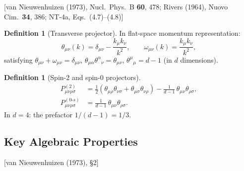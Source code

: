 \documentclass[11pt,a4paper]{article}
\theoremstyle{plain}
\theoremstyle{definition}
\newtheorem{definition}[theorem]{Definition}
\theoremstyle{remark}
\newcommand{\fromlit}[1]{\textcolor{sctblue}{\textsf{[#1]}}}
\begin{document}
\fromlit{van Nieuwenhuizen (1973), Nucl.\ Phys.\ B \textbf{60}, 478;
Rivers (1964), Nuovo Cim.\ \textbf{34}, 386;
NT-4a, Eqs.~(4.7)--(4.8)}

\begin{definition}[Transverse projector]\label{def:theta}
In flat-space momentum representation:
\begin{equation}\label{eq:theta}
  \theta_{\mu\nu}(k) = \delta_{\mu\nu} - \frac{k_\mu k_\nu}{k^2},
  \qquad
  \omega_{\mu\nu}(k) = \frac{k_\mu k_\nu}{k^2},
\end{equation}
satisfying $\theta_{\mu\nu} + \omega_{\mu\nu} = \delta_{\mu\nu}$,
$\theta_{\mu\alpha}\theta^{\alpha}{}_\nu = \theta_{\mu\nu}$,
$\theta^\mu{}_\mu = d - 1$ (in $d$ dimensions).
\end{definition}

\begin{definition}[Spin-2 and spin-0 projectors]\label{def:BR}
\begin{align}
  P^{(2)}_{\mu\nu\rho\sigma}
  &= \frac{1}{2}(\theta_{\mu\rho}\theta_{\nu\sigma}
  + \theta_{\mu\sigma}\theta_{\nu\rho})
  - \frac{1}{d-1}\,\theta_{\mu\nu}\theta_{\rho\sigma},
  \label{eq:P2}\\
  P^{(0\text{-}s)}_{\mu\nu\rho\sigma}
  &= \frac{1}{d-1}\,\theta_{\mu\nu}\theta_{\rho\sigma}.
  \label{eq:P0s}
\end{align}
In $d = 4$: the prefactor $1/(d-1) = 1/3$.
\end{definition}

\subsection{Key Algebraic Properties}

\fromlit{van Nieuwenhuizen (1973), \S2}
\end{document}
